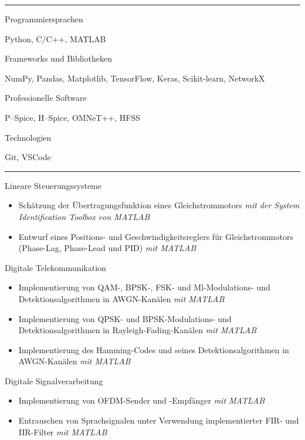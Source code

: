 \documentclass[a4paper,10pt]{article}
\newlength{\cvcolumngapwidth}
\newlength{\cvleftcolumnwidth}
\newlength{\cvrightcolumnwidth}
\newcommand{\cvsectionstyle}[1]{{\normalsize\cvsectionfont\textcolor{cvsectioncolor}{#1}}}
\newcommand{\cvheadingstyle}[1]{{\normalsize\cvheadingfont\textcolor{cvheadingcolor}{#1}}}
\newlength{\cvafteritemskipamount}
\newlength{\cvaftersectionskipamount}
\newlength{\cvbetweensectionandheadingextraskipamount}
\newlength{\cvparskip}
\newcommand{\cvsection}[1]{
    \begin{minipage}[t]{\cvleftcolumnwidth}
        \raggedleft\cvsectionstyle{#1}
    \end{minipage}%
    \hspace{\cvcolumngapwidth}%
    \begin{minipage}[t]{\cvrightcolumnwidth}
        \textcolor{cvrulecolor}{\rule{\cvrightcolumnwidth}{0.3mm}}
    \end{minipage}

    \vspace{\cvaftersectionskipamount}
}
\newcommand{\cvitem}[2]{
    \begin{minipage}[t]{\cvleftcolumnwidth}
        \raggedleft #1
    \end{minipage}%
    \hspace{\cvcolumngapwidth}%
    \begin{minipage}[t]{\cvrightcolumnwidth}
        \setlength{\parskip}{\cvparskip} #2
    \end{minipage}

    \vspace{\cvafteritemskipamount}
}
\begin{document}
\cvsection{TECHNISCHE FÄHIGKEITEN}
\vspace{\cvbetweensectionandheadingextraskipamount}
\cvitem{
    \cvheadingstyle{Programmiersprachen}
}{
    Python, C/C++, MATLAB
}
\vspace{-4mm}
\cvitem{
    \cvheadingstyle{Frameworks und Bibliotheken}
}{
    NumPy, Pandas, Matplotlib, TensorFlow, Keras, Scikit-learn, NetworkX
}
\vspace{-4mm}
\cvitem{
    \cvheadingstyle{Professionelle Software}
}{
    P–Spice, H–Spice, OMNeT++, HFSS
}
\vspace{-4mm}
\cvitem{
    \cvheadingstyle{Technologien}
}{
    Git, VSCode
}


\newpage


\cvsection{KURSPROJEKTE}
\vspace{\cvbetweensectionandheadingextraskipamount}
\cvitem{
    \cvheadingstyle{Lineare Steuerungssysteme}
}{
    \begin{itemize}[leftmargin=*]
        \item Schätzung der Übertragungsfunktion eines Gleichstrommotors \textit{\small{mit der System Identification Toolbox von MATLAB}}
        \item Entwurf eines Positions- und Geschwindigkeitsreglers für Gleichstrommotors (Phase-Lag, Phase-Lead und PID) \textit{\small{mit MATLAB}}
    \end{itemize}
}
\cvitem{
    \cvheadingstyle{Digitale Telekommunikation}
}{
    \begin{itemize}[leftmargin=*]
        \item Implementierung von QAM-, BPSK-, FSK- und Ml-Modulations- und Detektionsalgorithmen in AWGN-Kanälen \textit{\small{mit MATLAB}}
        \item Implementierung von QPSK- und BPSK-Modulations- und Detektionsalgorithmen in Rayleigh-Fading-Kanälen \textit{\small{mit MATLAB}}
        \item Implementierung des Hamming-Codes und seines Detektionsalgorithmen in AWGN-Kanälen \textit{\small{mit MATLAB}}

    \end{itemize}
}
\cvitem{
    \cvheadingstyle{Digitale Signalverarbeitung}
}{
    \begin{itemize}[leftmargin=*]
        \item Implementierung von OFDM-Sender und -Empfänger \textit{\small{mit MATLAB}}
        \item Entrauschen von Sprachsignalen unter Verwendung implementierter FIR- und IIR-Filter \textit{\small{mit MATLAB}}
    \end{itemize}
}
\end{document}
